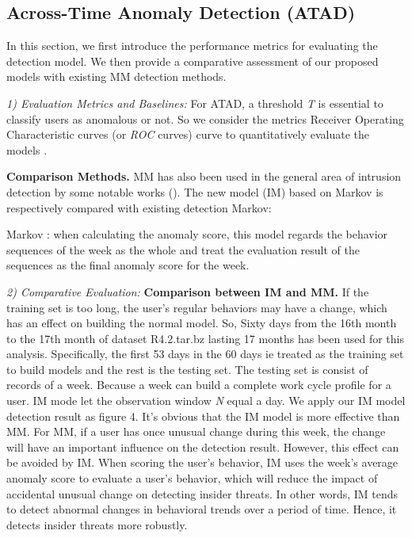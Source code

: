 \documentclass[conference]{IEEEtran}
\begin{document}
\subsection{Across-Time Anomaly Detection (ATAD)}
In this section, we first introduce the performance metrics for
evaluating the detection model. We then provide a
comparative assessment of our proposed models with existing MM detection methods.

\emph{1) Evaluation Metrics and Baselines:}
For ATAD, a threshold \emph{T} is essential to classify users as anomalous or not. 
So we consider the metrics Receiver Operating Characteristic curves (or \emph{ROC} curves) curve to quantitatively evaluate the models \cite{b17}.

\textbf{Comparison Methods.}
MM has also been used in the general area of intrusion detection by some notable works (\cite{b21}). The new model (IM) based on Markov is respectively compared with existing detection Markov:

Markov \cite{b21}: when calculating the anomaly score, this model regards the behavior sequences of the week as the whole and treat the evaluation result of the sequences as the final anomaly score for the week.

\emph{2) Comparative Evaluation:} 
\textbf{Comparison between IM and MM.}
If the training set is too long, the user's regular behaviors may have a change, which has an effect on building the normal model. So, Sixty days from the 16th month to the 17th month of dataset R4.2.tar.bz lasting 17 months has been used for this analysis. Specifically, the first 53 days in the 60 days ie treated as the training set to build models and the rest is the testing set. The testing set is consist of records of a week. Because a week can build a complete work cycle profile for a user. IM mode let the observation window \emph{N} equal a day.
We apply our IM model detection result as figure 4. It's obvious that the IM model is more effective than MM. For MM, if a user has once unusual change during this week, the change will have an important influence on the detection result. However, this effect can be avoided by IM. When scoring the user's behavior, IM uses the week's average anomaly score to evaluate a user's behavior, which will reduce the impact of accidental unusual change on detecting insider threats.
In other words, IM tends to detect abnormal changes in behavioral trends over a period of time. Hence, it detects insider threats more robustly. 
\end{document}
